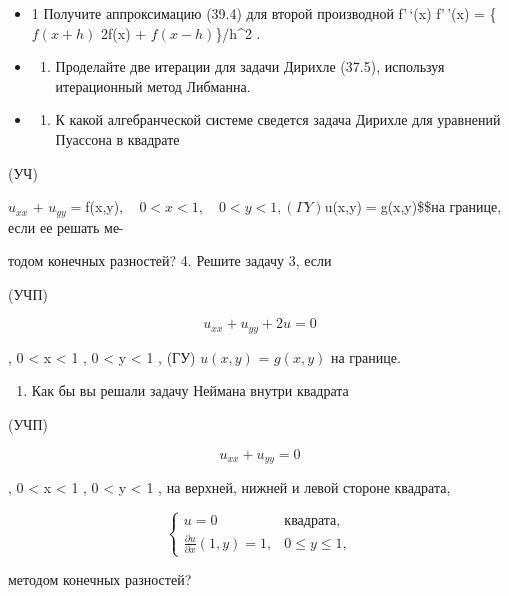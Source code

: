 \documentclass[
  ukrainian,
]{article}
\providecommand{\tightlist}{%
  \setlength{\itemsep}{0pt}\setlength{\parskip}{0pt}}
\begin{document}
\begin{itemize}
\item
  1 Получите аппроксимацию (39.4) для второй производной f'\,`(x)
  f'\,'(x) = \{\(f(x+h)\) 2f(x) + \(f(x-h)\)\}/h\^{}2 .
\item
  \begin{enumerate}
  \def\labelenumi{\arabic{enumi}.}
  \setcounter{enumi}{1}
  \tightlist
  \item
    Проделайте две итерации для задачи Дирихле (37.5), используя
    итерационный метод Либманна.
  \end{enumerate}
\item
  \begin{enumerate}
  \def\labelenumi{\arabic{enumi}.}
  \setcounter{enumi}{2}
  \tightlist
  \item
    К какой алгебранческой системе сведется задача Дирихле для уравнений
    Пуассона в квадрате
  \end{enumerate}
\end{itemize}

(УЧ\Pi)

\(u_{xx}\) +
\(u_{yy} =\)f(x,y)\(, \quad 0 < x < 1, \quad 0 < y < 1, (\Gamma Y)\)u(x,y)\(=\)g(x,y)\$\$на
границе, если ее решать ме-

тодом конечных разностей? 4. Решите задачу 3, если

(УЧП)

\[
u_{xx} + u_{yy} + 2u = 0
\]

, 0 \textless{} x \textless{} 1 , 0 \textless{} y \textless{} 1 , (ГУ)
\(u(x, y)\) = \(g(x, y)\) на границе.

\begin{enumerate}
\def\labelenumi{\arabic{enumi}.}
\setcounter{enumi}{4}
\tightlist
\item
  Как бы вы решали задачу Неймана внутри квадрата
\end{enumerate}

(УЧП)

\[
u_{xx} + u_{yy} = 0
\]

, 0 \textless{} x \textless{} 1 , 0 \textless{} y \textless{} 1 , на
верхней, нижней и левой стороне квадрата,

\[
\begin{cases} u = 0 & \text{квадрата,} \\ \frac{\partial u}{\partial x}(1, y) = 1, & 0 \leqslant y \leqslant 1, \end{cases}
\]

методом конечных разностей?
\end{document}
